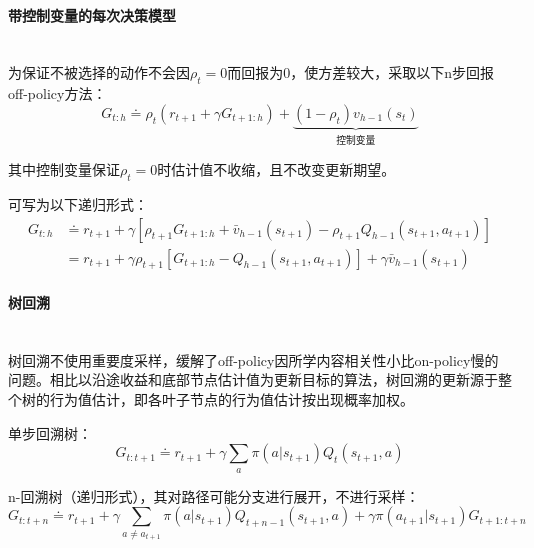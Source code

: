 \documentclass[
12pt, %
a4paper, 
oneside, %
headinclude,footinclude, %
]{scrartcl}
\begin{document}
\paragraph{带控制变量的每次决策模型}~\\

为保证不被选择的动作不会因$ \rho_t = 0 $而回报为$ 0 $，使方差较大，采取以下n步回报off-policy方法：
$$ G_{t:h} \doteq \rho_t (r_{t + 1} + \gamma G_{t + 1:h}) + \underbrace{(1 - \rho_t) v_{h - 1}(s_t)}_{\text{控制变量}} $$

其中控制变量保证$ \rho_t = 0 $时估计值不收缩，且不改变更新期望。

可写为以下递归形式：
\begin{align*}
G_{t:h} 
&\doteq r_{t + 1} + \gamma[\rho_{t + 1} G_{t + 1:h} + \bar{v}_{h - 1}(s_{t + 1}) - \rho_{t + 1} Q_{h - 1}(s_{t + 1}, a_{t + 1})] \\
&= r_{t + 1} + \gamma \rho_{t + 1}[G_{t + 1:h} - Q_{h - 1}(s_{t + 1}, a_{t + 1})] + \gamma \bar{v}_{h - 1}(s_{t + 1})
\end{align*}
\paragraph{树回溯}~\\

树回溯不使用重要度采样，缓解了off-policy因所学内容相关性小比on-policy慢的问题。相比以沿途收益和底部节点估计值为更新目标的算法，树回溯的更新源于整个树的行为值估计，即各叶子节点的行为值估计按出现概率加权。

单步回溯树：
$$ G_{t:t + 1} \doteq r_{t + 1} + \gamma \sum_{a} \pi(a|s_{t + 1}) Q_t(s_{t + 1}, a) $$

n-回溯树（递归形式），其对路径可能分支进行展开，不进行采样：
$$ G_{t:t + n} \doteq r_{t + 1} + \gamma \sum_{a \neq a_{t + 1}} \pi(a|s_{t + 1}) Q_{t + n - 1}(s_{t + 1}, a) + \gamma \pi(a_{t + 1}|s_{t + 1}) G_{t + 1:t + n} $$
\end{document}
